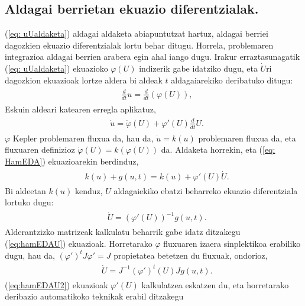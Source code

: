 \subsection*{Aldagai berrietan ekuazio diferentzialak.}

(\ref{eq: uUaldaketa}) aldagai aldaketa abiapuntutzat hartuz, aldagai berriei dagozkien ekuazio diferentzialak lortu behar ditugu. Horrela, problemaren integrazioa aldagai berrien arabera egin ahal iango dugu. Irakur erraztasunagatik (\ref{eq: uUaldaketa}) ekuazioko $\varphi(U)$ indizerik gabe idatziko dugu, eta $\dot{U}$ri dagozkion ekuazioak lortze aldera bi aldeak $t$ aldagaiarekiko deribatuko ditugu:  
\begin{align}
\begin{split}
&\frac{d}{dt}u = \frac{d}{dt}\left(\varphi(U)\right),
\end{split}
\end{align}
Eskuin aldeari katearen erregla aplikatuz, 
\begin{align}
\begin{split}
&\dot{u} = \dot{\varphi}(U) + \varphi'(U) \frac{d}{dt}U.
\end{split}
\end{align}
$\varphi$ Kepler problemaren fluxua da, hau da, $\dot{u} = k(u)$ problemaren fluxua da, eta fluxuaren definizioz $\dot{\varphi}(U) = k(\varphi(U))$ da. Aldaketa horrekin,  eta (\ref{eq: HamEDA}) ekuazioarekin berdinduz,
\begin{align}
\begin{split}
&k(u) + g(u,t) = k(u) + \varphi'(U) \dot{U}.
\end{split}
\end{align}
Bi aldeetan $k(u)$  kenduz, $U$ aldagaiekiko ebatzi beharreko ekuazio diferentziala lortuko dugu:
\begin{align}
\begin{split}
\label{eq:hamEDAU}
&\dot{U} = \left(\varphi'(U)\right)^{-1} g(u,t).
\end{split}
\end{align}
Alderantzizko matrizeak kalkulatu beharrik gabe idatz ditzakegu (\ref{eq:hamEDAU}) ekuazioak. Horretarako $\varphi$ fluxuaren izaera sinplektikoa erabiliko dugu, hau da, $(\varphi')^tJ\varphi'= J$ propietatea betetzen du fluxuak, ondorioz,
%
\begin{align}
\begin{split}
\label{eq:hamEDAU2}
&\dot{U} = J^{-1}(\varphi')^{t}(U)J g(u,t).
\end{split}
\end{align}
(\ref{eq:hamEDAU2}) ekuazioak $\varphi'(U)$ kalkulatzea eskatzen du, eta horretarako deribazio automatikoko teknikak erabil ditzakegu


